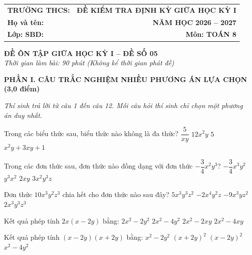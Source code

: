 \documentclass[12pt,a4paper]{article}
\begin{document}
\noindent
\begin{tabularx}{\linewidth}{X r}
\textbf{TRƯỜNG THCS: \dotfill} & \textbf{ĐỀ KIỂM TRA ĐỊNH KỲ GIỮA HỌC KỲ I} \\
\textbf{Họ và tên: \dotfill} & \textbf{NĂM HỌC 2026 -- 2027} \\
\textbf{Lớp: \dotfill \quad SBD: \dotfill} & \textbf{Môn: TOÁN 8} \\
\hline
\end{tabularx}
\vspace{2mm}

\begin{center}
  \textbf{\large ĐỀ ÔN TẬP GIỮA HỌC KỲ I -- ĐỀ SỐ 05}\\
  \textit{Thời gian làm bài: 90 phút (Không kể thời gian phát đề)}
\end{center}
\vspace{1mm}

\noindent\textbf{\large PHẦN I. CÂU TRẮC NGHIỆM NHIỀU PHƯƠNG ÁN LỰA CHỌN (3,0 điểm)}

\textit{Thí sinh trả lời từ câu 1 đến câu 12. Mỗi câu hỏi thí sinh chỉ chọn một phương án duy nhất.}

\vspace{1mm}
\begin{ex}
Trong các biểu thức sau, biểu thức nào không là đa thức?
\choice
{\True $\dfrac{5}{xy}$}
{$12x^2y$}
{$5$}
{$x^2y + 3xy + 1$}
\end{ex}

\begin{ex}
Trong các đơn thức sau, đơn thức nào đồng dạng với đơn thức $-\dfrac{3}{4}x^2y^3$?
\choice
{$-\dfrac{3}{4}x^3y^2$}
{\True $y^3x^2$}
{$2xy$}
{$3x^2y^3z$}
\end{ex}

\begin{ex}
Đơn thức $10x^3y^2z^3$ chia hết cho đơn thức nào sau đây?
\choice
{$5x^3y^3z^2$}
{$-2x^4y^2z$}
{\True $-9x^3yz^2$}
{$2x^3y^3z^3$}
\end{ex}

\begin{ex}
Kết quả phép tính $2x(x - 2y)$ bằng:
\choice
{$2x^2 - 2y^2$}
{$2x^2 - 4y^2$}
{$2x^2 - 2xy$}
{\True $2x^2 - 4xy$}
\end{ex}

\begin{ex}
Kết quả phép tính $(x - 2y)(x + 2y)$ bằng:
\choice
{$x^2 - 2y^2$}
{$(x + 2y)^2$}
{$(x - 2y)^2$}
{\True $x^2 - 4y^2$}
\end{ex}
\end{document}
